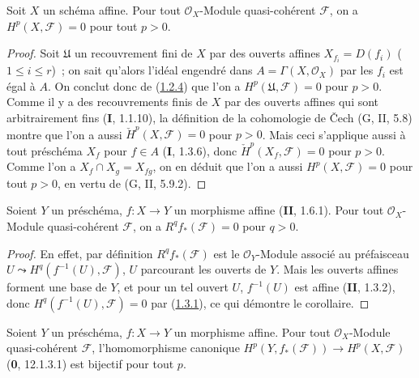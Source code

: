 \begin{theorem}[1.3.1]
\label{III.1.3.1-fr}
Soit $X$ un schéma affine. Pour tout $\mathcal O_X$-Module quasi-cohérent
$\mathcal F$, on a $H^p(X,\mathcal F)=0$ pour tout $p>0$.
\end{theorem}

\begin{proof}
Soit $\mathfrak U$ un recouvrement fini de $X$ par des ouverts affines
$X_{f_i}=D(f_i)$ ($1\leq i\leq r$)~; on sait qu'alors l'idéal engendré dans
$A=\Gamma(X,\mathcal O_X)$ par les $f_i$ est égal à $A$. On conclut donc de
(\hyperref[III.1.2.4-fr]{1.2.4}) que l'on a
$H^p(\mathfrak U,\mathcal F)=0$ pour $p>0$. Comme il y a des recouvrements
finis de $X$ par des ouverts affines qui sont arbitrairement fins (\textbf{I}, 1.1.10),
la définition de la cohomologie de Čech (G, II, 5.8) montre que l'on a aussi
$\check H^p(X,\mathcal F)=0$ pour $p>0$. Mais ceci s'applique aussi à tout
préschéma $X_f$ pour $f\in A$ (\textbf{I}, 1.3.6), donc
$\check H^p(X_f,\mathcal F)=0$ pour $p>0$. Comme l'on a
$X_f\cap X_g=X_{fg}$, on en déduit que l'on a aussi
$H^p(X,\mathcal F)=0$ pour tout $p>0$, en vertu de (G, II, 5.9.2).
\end{proof}

\begin{corollary}[1.3.2]
\label{III.1.3.2-fr}
Soient $Y$ un préschéma, $f:X\to Y$ un morphisme affine \textup{(\textbf{II}, 1.6.1)}. Pour
tout $\mathcal O_X$-Module quasi-cohérent $\mathcal F$, on a
$R^qf_*(\mathcal F)=0$ pour $q>0$.
\end{corollary}

\begin{proof}
En effet, par définition $R^qf_*(\mathcal F)$ est le $\mathcal O_Y$-Module
associé au préfaisceau $U\leadsto H^q(f^{-1}(U),\mathcal F)$, $U$ parcourant
les ouverts de $Y$. Mais les ouverts affines forment une base de $Y$, et pour
un tel ouvert $U$, $f^{-1}(U)$ est affine (\textbf{II}, 1.3.2), donc
$H^q(f^{-1}(U),\mathcal F)=0$ par
(\hyperref[III.1.3.1-fr]{1.3.1}), ce qui démontre le corollaire.
\end{proof}

\begin{corollary}[1.3.3]
\label{III.1.3.3-fr}
Soient $Y$ un préschéma, $f:X\to Y$ un morphisme affine. Pour tout
$\mathcal O_X$-Module quasi-cohérent $\mathcal F$, l'homomorphisme canonique
$H^p(Y,f_*(\mathcal F))\to H^p(X,\mathcal F)$ \textup{(\textbf{0}, 12.1.3.1)} est bijectif
pour tout $p$.
\end{corollary}

